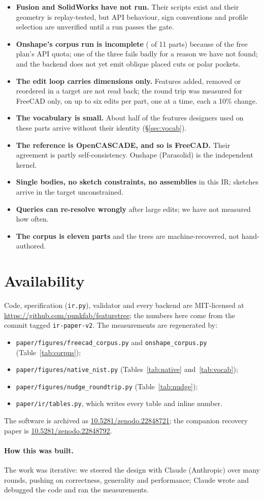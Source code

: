 \documentclass[11pt]{article}
\newcommand{\code}[1]{\texttt{\small #1}}
\begin{document}
\begin{itemize}
\item \textbf{Fusion and SolidWorks have not run.} Their scripts exist and their
  geometry is replay-tested, but API behaviour, sign conventions and profile
  selection are unverified until a run passes the gate.
\item \textbf{Onshape's corpus run is incomplete} (\OSrun{} of 11 parts) because of
  the free plan's API quota; one of the three fails badly for a reason we have
  not found; and the backend does not yet emit oblique placed cuts or polar
  pockets.
\item \textbf{The edit loop carries dimensions only.} Features added, removed or
  reordered in a target are not read back; the round trip was measured for
  FreeCAD only, on up to six edits per part, one at a time, each a 10\% change.
\item \textbf{The vocabulary is small.} About half of the features designers
  used on these parts arrive without their identity (\S\ref{sec:vocab}).
\item \textbf{The reference is OpenCASCADE, and so is FreeCAD.} Their agreement
  is partly self-consistency. Onshape (Parasolid) is the independent kernel.
\item \textbf{Single bodies, no sketch constraints, no assemblies} in this IR;
  sketches arrive in the target unconstrained.
\item \textbf{Queries can re-resolve wrongly} after large edits; we have not
  measured how often.
\item \textbf{The corpus is eleven parts} and the trees are machine-recovered,
  not hand-authored.
\end{itemize}

\section{Availability}

Code, specification (\code{ir.py}), validator and every backend are MIT-licensed
at \url{https://github.com/punkfab/featuretree}; the numbers here come from the commit tagged \code{ir-paper-v2}. The measurements are regenerated by:
\begin{itemize}
\item \code{paper/figures/freecad\_corpus.py} and \code{onshape\_corpus.py} (Table~\ref{tab:corpus});
\item \code{paper/figures/native\_nist.py} (Tables~\ref{tab:native} and~\ref{tab:vocab});
\item \code{paper/figures/nudge\_roundtrip.py} (Table~\ref{tab:nudge});
\item \code{paper/ir/tables.py}, which writes every table and inline number.
\end{itemize}
The software is archived as
\href{https://doi.org/10.5281/zenodo.22848721}{10.5281/zenodo.22848721}; the
companion recovery paper is
\href{https://doi.org/10.5281/zenodo.22848792}{10.5281/zenodo.22848792}.

\paragraph{How this was built.} The work was iterative: we steered the design
with Claude (Anthropic) over many rounds, pushing on correctness, generality and
performance; Claude wrote and debugged the code and ran the measurements.



\end{document}
